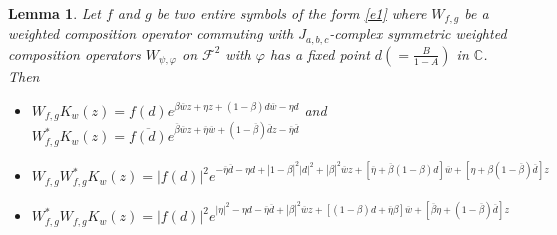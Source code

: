 \documentclass[reqno]{amsart}
\newtheorem{lemma}{Lemma}
\theoremstyle{remark}
\theoremstyle{Definition}
\theoremstyle{remark}
\numberwithin{equation}{section}
\begin{document}
\begin{lemma}\label{l3}Let $f$ and $g$ be two entire symbols of the form \eqref{e1} where $W_{f,g}$ be a weighted composition operator commuting with $J_{a,b,c}$-complex symmetric weighted  composition operators $W_{\psi, \varphi}$ on $\mathcal{F}^{2}$ with $\varphi$ has a fixed point 
$d(=\frac{B}{1-A})$ in $\mathbb{C}$. Then 
\begin{itemize}
\item[{(a)}] $W_{f,g}K_{w}(z)=f(d) e^{ \beta \overline{w}z+\eta z+(1-\beta)d \overline{w}-\eta d}$ and $W^{*}_{f,g}K_{w}(z)=\overline{f(d)}e^{\overline{\beta}\overline{w}z+\overline{\eta}\overline{w}+(1-\overline{\beta}) \overline{d}z- \overline{\eta}\overline{d}}$
    \item[{(b)}] $W_{f,g}W^{*}_{f,g}K_{w}(z)= |f(d)|^{2}e^{-\overline{\eta}\overline{d}-\eta d+|1-\beta|^{2}|d|^{2}+|\beta|^{2}\overline{w}z+[\overline{\eta}+\overline{\beta}(1-\beta)d]\overline{w}+[ \eta +\beta(1-\overline{\beta})\overline{d}]z}$\\
    \item[{(c)}] $W^{*}_{f,g}W_{f,g}K_{w}(z)=|f(d)|^{2}e^{|\eta|^{2}-\eta d-\overline{\eta}\overline{d}+|\beta|^{2}\overline{w}z+[(1-\beta)d+\overline{\eta}\beta]\overline{w}+[\overline{\beta} \eta +(1-\overline{\beta})\overline{d}]z}$
\end{itemize} 
\end{lemma}
\end{document}
